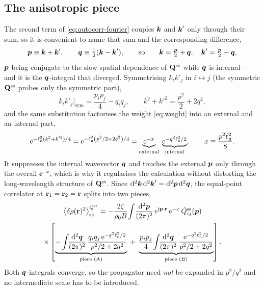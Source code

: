 \documentclass[a5paper]{article}
\begin{document}
\subsection{The anisotropic piece}
\label{sec-aniso}

The second term of \eqref{eq:autocorr-fourier} couples $\boldsymbol{k}$ and $\boldsymbol{k}'$ only through their sum, so it is convenient to name that sum and the corresponding difference,
\begin{equation}
    \label{eq:pq-vars}
    \boldsymbol p \equiv \boldsymbol{k}+\boldsymbol{k}',\qquad \boldsymbol q \equiv \tfrac12(\boldsymbol{k}-\boldsymbol{k}'),
    \qquad\text{so}\qquad \boldsymbol{k} = \tfrac{\boldsymbol p}{2}+\boldsymbol q,\quad \boldsymbol{k}' = \tfrac{\boldsymbol p}{2}-\boldsymbol q,
\end{equation}
$\boldsymbol p$ being conjugate to the slow spatial dependence of $\mathbf{Q}^{\mathrm{ss}}$ while $\boldsymbol q$ is internal --- and it is the $\boldsymbol q$-integral that diverged. Symmetrising $k_ik'_j$ in $i\leftrightarrow j$ (the symmetric $\mathbf{Q}^{\mathrm{ss}}$ probes only the symmetric part),
\begin{equation}
    \label{eq:kk-sym}
    k_i k'_j\big|_\mathrm{sym} = \frac{p_i p_j}{4} - q_i q_j,
    \qquad
    k^2+k'^2 = \frac{p^2}{2}+2q^2 ,
\end{equation}
and the same substitution factorises the weight \eqref{eq:weight} into an external and an internal part,
\begin{equation}
    \label{eq:weight-pq}
    \mathrm{e}^{-\ell_{\rm n}^2(k^2+k'^2)/4} = \mathrm{e}^{-\ell_{\rm n}^2\left(p^2/2+2q^2\right)/4} = \underbrace{\mathrm{e}^{-x}}_{\text{external}}\;\underbrace{\mathrm{e}^{-q^2\ell_{\rm n}^2/2}}_{\text{internal}},
    \qquad x \equiv \frac{p^2\ell_{\rm n}^2}{8}.
\end{equation}
It suppresses the internal wavevector $\boldsymbol q$ and touches the external $\boldsymbol p$ only through the overall $\ee^{-x}$, which is why it regularises the calculation without distorting the long-wavelength structure of $\mathbf{Q}^{\mathrm{ss}}$. Since $\mathrm{d}^2\boldsymbol{k}\,\mathrm{d}^2\boldsymbol{k}' = \mathrm{d}^2\boldsymbol p\,\mathrm{d}^2\boldsymbol q$, the equal-point correlator at $\mathbf{r}_1=\mathbf{r}_2=\mathbf{r}$ splits into two pieces,
\begin{multline}
    \label{eq:aniso-fourier-split}
    \left\langle\delta\rho(\mathbf{r})^2\right\rangle^{Q^{\mathrm{ss}}}_{\mathrm{ss}} = -\frac{2\zeta}{\rho_0 B}\!\int\!\frac{\mathrm{d}^2\boldsymbol p}{(2\pi)^2}\,\mathrm{e}^{\mathrm{i}\boldsymbol p\cdot\mathbf{r}}\,\mathrm{e}^{-x}\,\tilde Q^{\mathrm{ss}}_{ij}(\boldsymbol p)
    \\
    \times\left[\underbrace{-\int\!\!\frac{\mathrm{d}^2\boldsymbol q}{(2\pi)^2}\,\frac{q_iq_j\,\mathrm{e}^{-q^2\ell_{\rm n}^2/2}}{p^2/2+2q^2}}_{\text{piece (A)}}\;+\;\underbrace{\frac{p_ip_j}{4}\!\int\!\!\frac{\mathrm{d}^2\boldsymbol q}{(2\pi)^2}\,\frac{\mathrm{e}^{-q^2\ell_{\rm n}^2/2}}{p^2/2+2q^2}}_{\text{piece (B)}}\right].
\end{multline}
Both $\boldsymbol q$-integrals converge, so the propagator need \emph{not} be expanded in $p^2/q^2$ and no intermediate scale has to be introduced.
\end{document}
